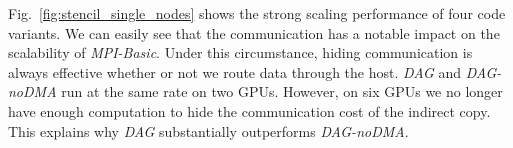 Fig.~\ref{fig:stencil_single_nodes} shows the strong scaling performance of four code variants.
We can easily see that the communication has a notable impact on the scalability of {\em MPI-Basic}.
Under this circumstance, hiding communication is always effective whether or not we route data through the host.
{\em DAG} and {\em DAG-noDMA} run at the same rate on two GPUs.
However, on six GPUs we no longer have enough computation to hide the communication cost of the indirect copy.
This explains why {\em DAG} substantially outperforms {\em DAG-noDMA}.









